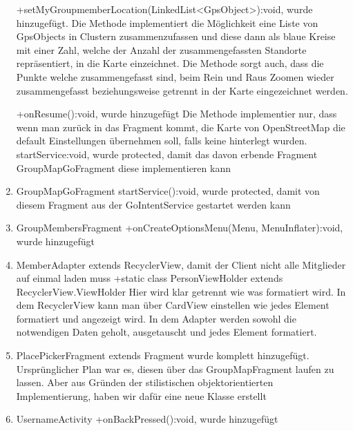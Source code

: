 \begin{enumerate}
	+setMyGroupmemberLocation(LinkedList<GpsObject>):void, wurde hinzugefügt. Die Methode implementiert die Möglichkeit eine Liste von GpsObjects in Clustern zusammenzufassen und diese dann als blaue Kreise mit einer Zahl, welche der Anzahl der zusammengefassten Standorte repräsentiert, in die Karte einzeichnet. Die Methode sorgt auch, dass die Punkte welche zusammengefasst sind, beim Rein und Raus Zoomen wieder zusammengefasst beziehungsweise getrennt in der Karte eingezeichnet werden.

	+onResume():void, wurde hinzugefügt Die Methode implementier nur, dass wenn man zurück in das Fragment kommt, die Karte von OpenStreetMap die default Einstellungen übernehmen soll, falls keine hinterlegt wurden.
	startService:void, wurde protected, damit das davon erbende Fragment GroupMapGoFragment diese implementieren kann
	\item GroupMapGoFragment
	startService():void, wurde protected, damit von diesem Fragment aus der GoIntentService gestartet werden kann
	\item GroupMembersFragment
	+onCreateOptionsMenu(Menu, MenuInflater):void, wurde hinzugefügt
	\item MemberAdapter
	extends RecyclerView, damit der Client nicht alle Mitglieder auf einmal laden muss
	+static class PersonViewHolder extends RecyclerView.ViewHolder Hier wird klar getrennt wie was formatiert wird. In dem RecyclerView kann man über CardView einstellen wie jedes Element formatiert und angezeigt wird. In dem Adapter werden sowohl die notwendigen Daten geholt, ausgetauscht und jedes Element formatiert.
	\item PlacePickerFragment extends Fragment
	wurde komplett hinzugefügt. Ursprünglicher Plan war es, diesen über das GroupMapFragment laufen zu lassen. Aber aus Gründen der stilistischen objektorientierten Implementierung, haben wir dafür eine neue Klasse erstellt
	\item UsernameActivity
	+onBackPressed():void, wurde hinzugefügt

\end{enumerate}

